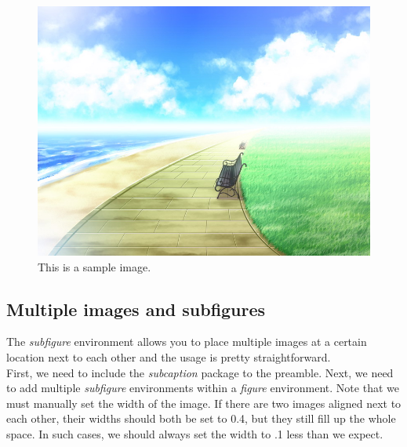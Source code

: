 \documentclass[11pt]{article}  %
\begin{document}
      \begin{figure}[H]  %
        \includegraphics[width=\linewidth]{../resources/BG62.JPG}  %
        \caption{This is a sample image.}  %
        \label{f1}  %
      \end{figure}

    \subsection{Multiple images and subfigures}
      The \textit{subfigure} environment allows you to place multiple images at a certain location next to each other and the usage is pretty straightforward.\\

      First, we need to include the \textit{subcaption} package to the preamble. Next, we need to add multiple \textit{subfigure} environments within a \textit{figure} environment. Note that we must manually set the width of the image. If there are two images aligned next to each other, their widths should both be set to 0.4, but they still fill up the whole space. In such cases, we should always set the width to .1 less than we expect.
\end{document}
